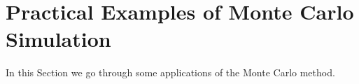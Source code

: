 %
%
%

\section{Practical Examples of Monte Carlo
Simulation}\label{example-of-monte-carlo-simulation}

In this Section we go through some applications of the Monte Carlo method.

